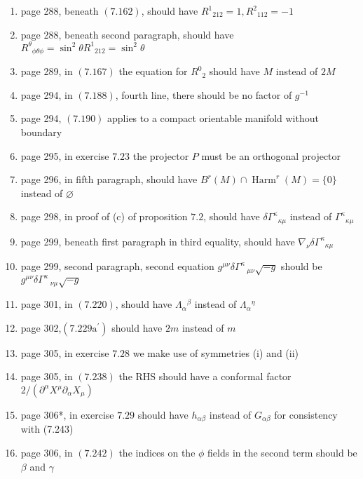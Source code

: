 \documentclass{article}
\begin{document}
\begin{enumerate}
\item page 288, beneath $(7.162)$, should have $R^{1}{}_{212}=1, R^{2}{}_{112}=-1$

\item page 288, beneath second paragraph, should have $R^{\theta}{}_{\phi \theta \phi}=\sin ^{2} \theta R^{1}{}_{212}=\sin ^{2} \theta$

\item page 289, in $(7.167)$ the equation for $R^{0}{}_{2}$ should have $M$ instead of $2 M$

\item page 294, in $(7.188)$, fourth line, there should be no factor of $g^{-1}$

\item page 294, $(7.190)$ applies to a compact orientable manifold without boundary

\item page 295, in exercise $7.23$ the projector $P$ must be an orthogonal projector

\item page 296, in fifth paragraph, should have $B^{r}(M) \cap \operatorname{Harm}^{r}(M)=\{0\}$ instead of $\varnothing$

\item page 298, in proof of (c) of proposition $7.2$, should have $\delta \Gamma^{\kappa}{}_{\kappa \mu}$ instead of $\Gamma^{\kappa}{}_{\kappa \mu}$

\item page 299, beneath first paragraph in third equality, should have $\nabla_\nu \delta \Gamma^{\kappa}{}_{\kappa \mu}$

\item page 299, second paragraph, second equation $g^{\mu\nu}\delta\Gamma^\kappa\,_{\mu\nu}\sqrt{-g}$ should be $g^{\mu\nu}\delta\Gamma^\kappa\,_{\nu\mu}\sqrt{-g}$

\item page 301, in $(7.220)$, should have $\Lambda_{\alpha}{ }^{\beta}$ instead of $\Lambda_{\alpha}{ }^{\eta}$

\item page 302,$ \left(7.229 \mathrm{a}^{\prime}\right)$ should have $2 m$ instead of $m$

\item page 305, in exercise $7.28$ we make use of symmetries (i) and (ii)

\item page 305, in $(7.238)$ the $\mathrm{RHS}$ should have a conformal factor $2 /\left(\partial^{\alpha} X^{\mu} \partial_{\alpha} X_{\mu}\right)$

\item page 306*, in exercise $7.29$ should have $h_{\alpha \beta}$ instead of $G_{\alpha \beta}$ for consistency with (7.243)

\item page 306, in $(7.242)$ the indices on the $\phi$ fields in the second term should be $\beta$ and $\gamma$
\end{enumerate}
\end{document}

